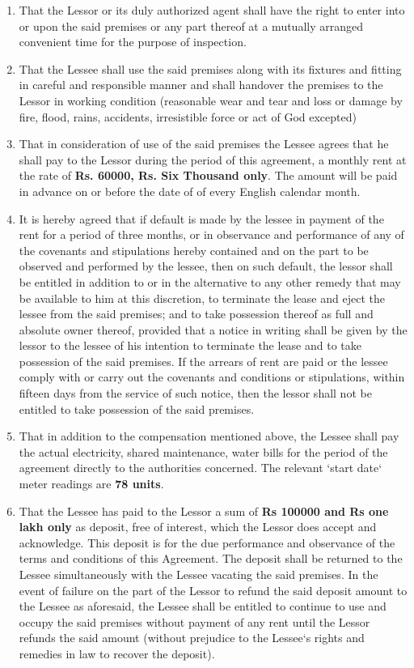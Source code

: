\documentclass[legalpaper,12pt]{article}
\begin{document}
\begin{enumerate}
    \item That the Lessor or its duly authorized agent shall have the right to enter into or upon the said premises or any part thereof at a mutually arranged convenient time for the purpose of inspection.
    
    \item  That the Lessee shall use the said premises along with its fixtures and fitting in careful and responsible manner and shall handover the premises to the Lessor in working condition (reasonable wear and tear and loss or damage by fire, flood, rains, accidents, irresistible force or act of God excepted)
    
    \item That in consideration of use of the said premises the Lessee agrees that he shall pay to the Lessor during the period of this agreement, a monthly rent at the rate of \textbf{Rs. 60000, Rs. Six Thousand only}. The amount will be paid in advance on or before the date of \textbf{} of every English calendar month.
    
    \item  It is hereby agreed that if default is made by the lessee in payment of the rent for a period of three months, or in observance and performance of any of the covenants and stipulations hereby contained and on the part to be observed and performed by the lessee, then on such default, the lessor shall be entitled in addition to or in the alternative to any other remedy that may be available to him at this discretion, to terminate the lease and eject the lessee from the said premises; and to take possession thereof as full and absolute owner thereof, provided that a notice in writing shall be given by the lessor to the lessee of his intention to terminate the lease and to take possession of the said premises. If the arrears of rent are paid or the lessee comply with or carry out the covenants and conditions or stipulations, within fifteen days from the service of such notice, then the lessor shall not be entitled to take possession of the said premises.
    
    \item  That in addition to the compensation mentioned above, the Lessee shall pay the actual electricity, shared maintenance, water bills for the period of the agreement directly to the authorities concerned. The relevant `start date` meter readings are \textbf{78 units}.
    
    \item That the Lessee has paid to the Lessor a sum of \textbf{Rs 100000 and  Rs one lakh only} as deposit, free of interest, which the Lessor does accept and acknowledge. This deposit is for the due performance and observance of the terms and conditions of this Agreement. The deposit shall be returned to the Lessee simultaneously with the Lessee vacating the said premises. In the event of failure on the part of the Lessor to refund the said deposit amount to the Lessee as aforesaid, the Lessee shall be entitled to continue to use and occupy the said premises without payment of any rent until the Lessor refunds the said amount (without prejudice to the Lessee`s rights and remedies in law to recover the deposit).
    

\end{enumerate}
\end{document}
